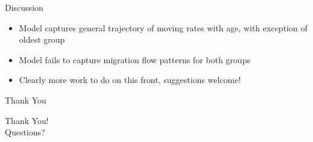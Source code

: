 \documentclass{beamer}
\begin{document}
\begin{frame}{Discussion}
  \begin{itemize}
    \item Model captures general trajectory of moving rates with age, with exception of oldest group
    \item Model fails to capture migration flow patterns for both groups
    \item Clearly more work to do on this front, suggestions welcome!
  \end{itemize}
\end{frame}
\begin{frame}{Thank You}
  \begin{center}
    \Huge Thank You! \\
    \vspace{1cm}
    \Large Questions?
  \end{center}
\end{frame}
\end{document}
